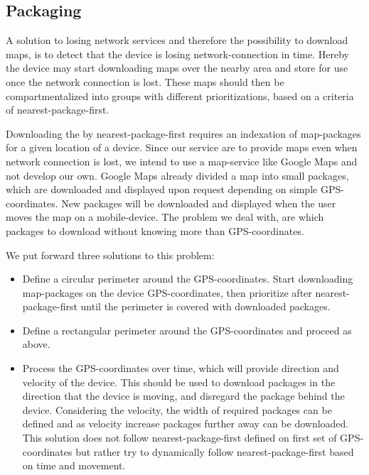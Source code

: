 \subsection{Packaging}
\label{sec:packingadv}

A solution to losing network services and therefore the possibility to download maps, is to detect that the device is losing network-connection in time. Hereby the device may start downloading maps over the nearby area and store for use once the network connection is lost. These maps should then be compartmentalized into groups with different prioritizations, based on a criteria of nearest-package-first. 

Downloading the by nearest-package-first requires an indexation of map-packages for a given location of a device. Since our service are to provide maps even when network connection is lost, we intend to use a map-service like Google Maps and not develop our own. Google Maps already divided a map into small packages, which are downloaded and displayed upon request depending on simple GPS-coordinates. New packages will be downloaded and displayed when the user moves the map on a mobile-device. The problem we deal with, are which packages to download without knowing more than GPS-coordinates. 

We put forward three solutions to this problem:
\begin{itemize}
\item Define a circular perimeter around the GPS-coordinates. Start downloading map-packages on the device GPS-coordinates, then prioritize after nearest-package-first until the perimeter is covered with downloaded packages.
\item Define a rectangular perimeter around the GPS-coordinates and proceed as above.
\item Process the GPS-coordinates over time, which will provide direction and velocity of the device. This should be used to download packages in the direction that the device is moving, and disregard the package behind the device. Considering the velocity, the width of required packages can be defined and as velocity increase packages further away can be downloaded. This solution does not follow nearest-package-first defined on first set of GPS-coordinates but rather try to dynamically follow nearest-package-first based on time and movement.
\end{itemize}




